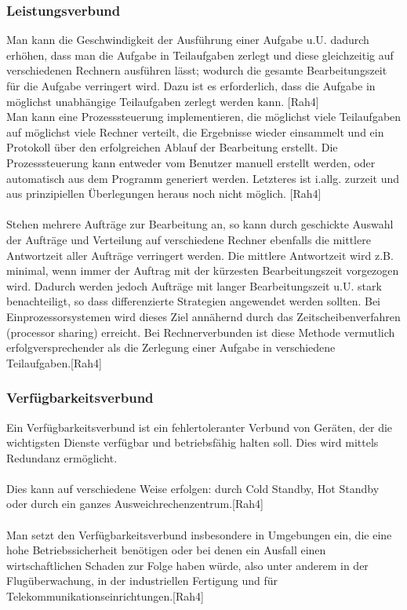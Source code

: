 \documentclass[letterpaper, 12pt]{article}
\let\tempsubsubsection\subsubsection
\renewcommand\subsubsection[1]{\vspace{0cm}\tempsubsubsection{#1}\vspace{0cm}}
\begin{document}
\subsubsection{Leistungsverbund}
Man kann die Geschwindigkeit der Ausführung einer Aufgabe u.U. dadurch erhöhen, dass man die Aufgabe in Teilaufgaben zerlegt und diese gleichzeitig auf verschiedenen Rechnern ausführen lässt; wodurch die gesamte Bearbeitungszeit für die Aufgabe verringert wird. Dazu ist es erforderlich, dass die Aufgabe in möglichst unabhängige Teilaufgaben zerlegt werden kann. [Rah4]\\
Man kann eine Prozesssteuerung implementieren, die möglichst viele Teilaufgaben auf möglichst viele Rechner verteilt, die Ergebnisse wieder einsammelt und ein Protokoll über den erfolgreichen Ablauf der Bearbeitung erstellt. Die Prozesssteuerung kann entweder vom Benutzer manuell erstellt werden, oder automatisch aus dem Programm generiert werden. Letzteres ist i.allg. zurzeit und aus prinzipiellen Überlegungen heraus noch nicht möglich. [Rah4]\\\\
Stehen mehrere Aufträge zur Bearbeitung an, so kann durch geschickte Auswahl der Aufträge und Verteilung auf verschiedene Rechner ebenfalls die mittlere Antwortzeit aller Aufträge verringert werden. Die mittlere Antwortzeit wird z.B. minimal, wenn immer der Auftrag mit der kürzesten Bearbeitungszeit vorgezogen wird. Dadurch werden jedoch Aufträge mit langer Bearbeitungszeit u.U. stark benachteiligt, so dass differenzierte Strategien angewendet werden sollten. Bei Einprozessorsystemen wird dieses Ziel annähernd durch das Zeitscheibenverfahren (processor sharing) erreicht. Bei Rechnerverbunden ist diese Methode vermutlich erfolgversprechender als die Zerlegung einer Aufgabe in verschiedene Teilaufgaben.[Rah4]\\
\subsubsection{Verfügbarkeitsverbund}
Ein Verfügbarkeitsverbund ist ein fehlertoleranter Verbund von Geräten, der die wichtigsten Dienste verfügbar und betriebsfähig halten soll. Dies wird mittels Redundanz ermöglicht.\\\\
Dies kann auf verschiedene Weise erfolgen: durch Cold Standby, Hot Standby oder durch ein ganzes Ausweichrechenzentrum.[Rah4]\\\\
Man setzt den Verfügbarkeitsverbund insbesondere in Umgebungen ein, die eine hohe Betriebssicherheit benötigen oder bei denen ein Ausfall einen wirtschaftlichen Schaden zur Folge haben würde, also unter anderem in der Flugüberwachung, in der industriellen Fertigung und für Telekommunikationseinrichtungen.[Rah4]\\\\
\end{document}
